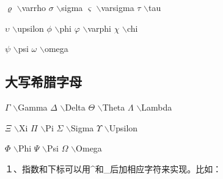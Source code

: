 \documentclass[UTF8]{ctexart}
\begin{document}
$\varrho$ \quad $\backslash$varrho \qquad
$\sigma$ \quad $\backslash$sigma \qquad
$\varsigma$ \quad $\backslash$varsigma \qquad
$\tau$ \quad $\backslash$tau \qquad

$\upsilon$ \quad $\backslash$upsilon \qquad
$\phi$ \quad $\backslash$phi \qquad
$\varphi$ \quad $\backslash$varphi \qquad
$\chi$ \quad $\backslash$chi \qquad

$\psi$ \quad $\backslash$psi \qquad
$\omega$ \quad $\backslash$omega \qquad


\subsection{大写希腊字母}

$\Gamma$ \quad $\backslash$Gamma \qquad
$\Delta$ \quad $\backslash$Delta \qquad
$\Theta$ \quad $\backslash$Theta \qquad
$\Lambda$ \quad $\backslash$Lambda \qquad

$\Xi$ \quad $\backslash$Xi \qquad
$\Pi$ \quad $\backslash$Pi \qquad
$\Sigma$ \quad $\backslash$Sigma \qquad
$\Upsilon$ \quad $\backslash$Upsilon \qquad

$\Phi$ \quad $\backslash$Phi \qquad
$\Psi$ \quad $\backslash$Psi \qquad
$\Omega$ \quad $\backslash$Omega \qquad



１、指数和下标可以用\^{}和\_后加相应字符来实现。比如：
\end{document}

